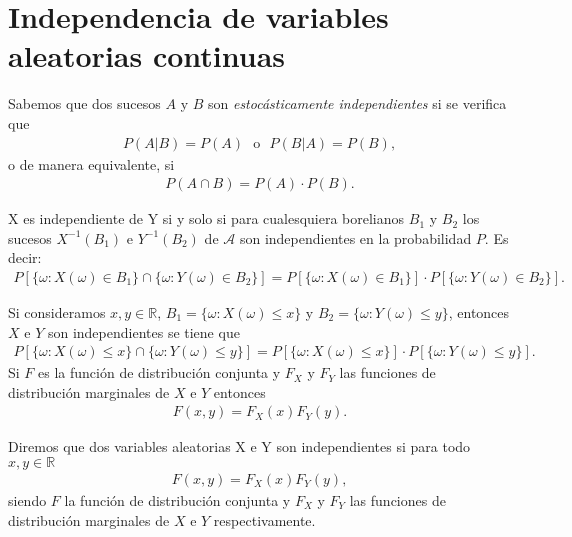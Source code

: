 \section{Independencia de variables aleatorias continuas}

Sabemos que dos sucesos $A$ y $B$ son \textit{estocásticamente independientes} si se verifica que
\begin{align*}
    P(A|B) = P(A) \ \ \ \text{o} \ \ \ P(B|A) = P(B),
\end{align*}
o de manera equivalente, si
\begin{align*}
    P(A \cap B) = P(A) \cdot P(B).
\end{align*}

\begin{defi}
    X es independiente de Y si y solo si para cualesquiera borelianos $B_1$ y $B_2$ los sucesos $X^{-1}(B_1)$ e $Y^{-1}(B_2)$ de $\mathcal{A}$ son independientes en la probabilidad $P$. Es decir:
    \begin{align*}
        P[\{ \omega : X(\omega) \in B_1\} \cap \{ \omega : Y(\omega) \in B_2\}] = P[\{\omega : X(\omega) \in B_1\}] \cdot P[\{\omega : Y(\omega) \in B_2\}].
    \end{align*}
\end{defi}

Si consideramos $x,y \in \mathbb{R}$, $B_1 = \{ \omega : X(\omega) \leq x\}$ y $B_2 = \{ \omega : Y(\omega) \leq y\}$, entonces $X$ e $Y$ son independientes se tiene que
\begin{align*}
    P[\{ \omega : X(\omega) \leq x\} \cap \{ \omega : Y(\omega) \leq y\}] = P[\{\omega : X(\omega) \leq x\}] \cdot P[\{\omega : Y(\omega) \leq y\}].
\end{align*}
Si $F$ es la función de distribución conjunta y $F_X$ y $F_Y$ las funciones de distribución marginales de $X$ e $Y$ entonces
\begin{align*}
    F(x,y) = F_X(x)F_Y(y).
\end{align*}

\begin{defi}
    Diremos que dos variables aleatorias X e Y son independientes si para todo $x,y \in \mathbb{R}$
    \begin{align*}
        F(x,y) = F_X(x)F_Y(y),
    \end{align*}
    siendo $F$ la función de distribución conjunta y $F_X$ y $F_Y$ las funciones de distribución marginales de $X$ e $Y$ respectivamente.
\end{defi}

